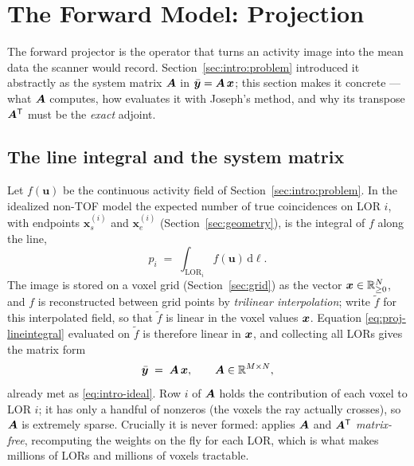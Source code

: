 \section{The Forward Model: Projection}
\label{sec:projection}

The forward projector is the operator that turns an activity image into the
mean data the scanner would record. Section~\ref{sec:intro:problem} introduced
it abstractly as the system matrix $\bm{A}$ in $\bar{\bm{y}} = \bm{A}\,\bm{x}$; this section
makes it concrete --- what $\bm{A}$ computes, how  evaluates it
with Joseph's method, and why its transpose $\bm{A}^{\mathsf{T}}$ must be the \emph{exact}
adjoint.

\subsection{The line integral and the system matrix}
\label{sec:projection:lineintegral}

Let $f(\bm{u})$ be the continuous activity field of
Section~\ref{sec:intro:problem}. In the idealized non-TOF model the expected
number of true coincidences on LOR $i$, with endpoints
$\bm{x}_s^{(i)}$ and $\bm{x}_e^{(i)}$
(Section~\ref{sec:geometry}), is the integral of $f$ along the line,
\begin{equation}
  p_i \;=\; \int_{\mathrm{LOR}_i} f(\bm{u})\,\mathrm{d}\ell .
  \label{eq:proj-lineintegral}
\end{equation}
The image is stored on a voxel grid (Section~\ref{sec:grid}) as the vector
$\bm{x}\in\mathbb{R}^N_{\ge0}$, and $f$ is reconstructed between grid points by
\emph{trilinear interpolation}; write $\tilde f$ for this interpolated field, so
that $\tilde f$ is linear in the voxel values $\bm{x}$. Equation
\eqref{eq:proj-lineintegral} evaluated on $\tilde f$ is therefore linear in
$\bm{x}$, and collecting all LORs gives the matrix form
\begin{equation}
  \bar{\bm{y}} \;=\; \bm{A}\,\bm{x} ,
  \qquad
  \bm{A} \in \mathbb{R}^{M\times N},
  \label{eq:proj-matrix}
\end{equation}
already met as \eqref{eq:intro-ideal}. Row $i$ of $\bm{A}$ holds the contribution
of each voxel to LOR $i$; it has only a handful of nonzeros (the voxels the ray
actually crosses), so $\bm{A}$ is extremely sparse. Crucially it is never formed:
 applies $\bm{A}$ and $\bm{A}^{\mathsf{T}}$ \emph{matrix-free}, recomputing the
weights on the fly for each LOR, which is what makes millions of LORs and
millions of voxels tractable.

